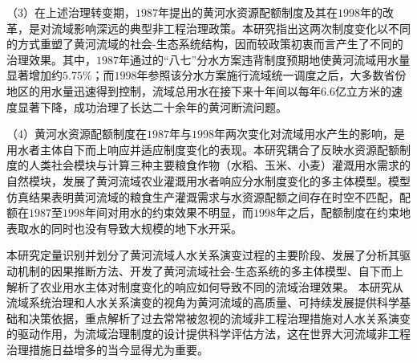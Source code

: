 \begin{cabstract}
（3）在上述治理转变期，$1987$年提出的黄河水资源配额制度及其在$1998$年的改革，是对流域影响深远的典型非工程治理政策。本研究指出这两次制度变化以不同的方式重塑了黄河流域的社会-生态系统结构，因而较政策初衷而言产生了不同的治理效果。其中，$1987$年通过的“八七”分水方案违背制度预期地使黄河流域用水量显著增加约$5.75\%$；而$1998$年参照该分水方案施行流域统一调度之后，大多数省份地区的用水量迅速得到控制，流域总用水在接下来十年间以每年$6.6$亿立方米的速度显著下降，成功治理了长达二十余年的黄河断流问题。

（4）黄河水资源配额制度在$1987$年与$1998$年两次变化对流域用水产生的影响，是用水者主体自下而上响应并适应制度变化的表现。本研究耦合了反映水资源配额制度的人类社会模块与计算三种主要粮食作物（水稻、玉米、小麦）灌溉用水需求的自然模块，发展了黄河流域农业灌溉用水者响应分水制度变化的多主体模型。模型仿真结果表明黄河流域的粮食生产灌溉需求与水资源配额之间存在时空不匹配，配额在$1987$至$1998$年间对用水的约束效果不明显，而$1998$年之后，配额制度在约束地表取水的同时也没有导致大规模的地下水开采。

本研究定量识别并划分了黄河流域人水关系演变过程的主要阶段、发展了分析其驱动机制的因果推断方法、开发了黄河流域社会-生态系统的多主体模型、自下而上解析了农业用水主体对制度变化的响应如何导致不同的流域治理效果。
本研究从流域系统治理和人水关系演变的视角为黄河流域的高质量、可持续发展提供科学基础和决策依据，重点解析了过去常常被忽视的流域非工程治理措施对人水关系演变的驱动作用，为流域治理制度的设计提供科学评估方法，这在世界大河流域非工程治理措施日益增多的当今显得尤为重要。


\end{cabstract}



